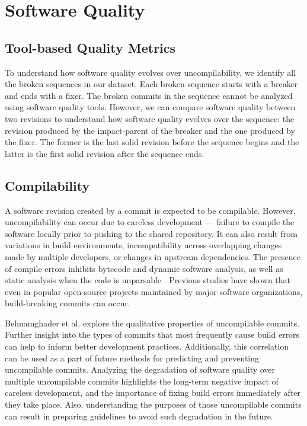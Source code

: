 \section{Software Quality}
\label{sec:quality}

\subsection{Tool-based Quality Metrics}

To understand how software quality evolves over uncompilability, we identify all the broken sequences in our dataset.
Each broken sequence starts with a breaker and ends with a fixer. The broken commits in the sequence cannot be analyzed using software quality tools. 
However, we can compare software quality between two revisions to understand how software quality evolves over the sequence: the revision produced by the impact-parent of the breaker and the one produced by the fixer.
The former is the last solid revision before the sequence begins and the latter is the first solid revision after the sequence ends. 


\subsection{Compilability}


A software revision created by a commit is expected to be compilable. However, uncompilability can occur due to careless development --- failure to compile the software locally prior to pushing to the shared repository. It can also result from variations in build environments, incompatibility across overlapping changes made by multiple developers, or changes in upstream dependencies. 
The presence of compile errors inhibits bytecode and dynamic software analysis, as well as static analysis when the code is unparsable \cite{pooyan_esem}.
Previous studies \cite{pooyan_esem, 8170083, Hassan2017ESEM, SMR:SMR1838} have shown that even in popular open-source projects maintained by major software organizations, build-breaking commits can occur.

Behnamghader et al. \cite{pooyan_qrs} explore the qualitative properties of uncompilable commits.
Further insight into the types of commits that most frequently cause build errors can help to inform better development practices. Additionally, this correlation can be used as a part of future methods for predicting and preventing uncompilable commits. 
Analyzing the degradation of software quality over multiple uncompilable commits highlights the long-term negative impact of careless development, and the importance of fixing build errors immediately after they take place.
Also, understanding the purposes of those uncompilable commits can result in preparing guidelines to avoid such degradation in the future.


